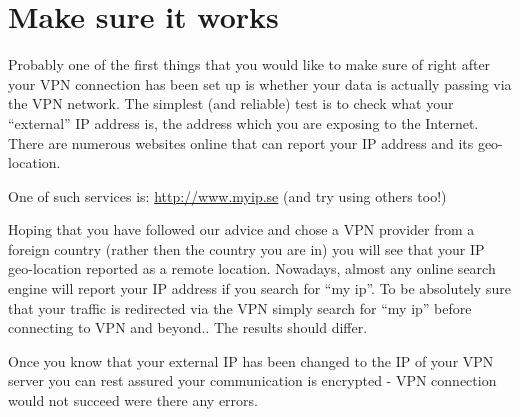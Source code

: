 \section{Make sure it works}

Probably one of the first things that you would like to make sure of
right after your VPN connection has been set up is whether your data is
actually passing via the VPN network. The simplest (and reliable) test
is to check what your ``external'' IP address is, the address which you
are exposing to the Internet. There are numerous websites online that
can report your IP address and its geo-location.

One of such services is: \href{http://www.myip.se}{http://www.myip.se}
(and try using others too!)

Hoping that you have followed our advice and chose a VPN provider from a
foreign country (rather then the country you are in) you will see that
your IP geo-location reported as a remote location. Nowadays, almost any
online search engine will report your IP address if you search for ``my
ip''. To be absolutely sure that your traffic is redirected via the VPN
simply search for ``my ip'' before connecting to VPN and beyond.. The
results should differ.

Once you know that your external IP has been changed to the IP of your
VPN server you can rest assured your communication is encrypted - VPN
connection would not succeed were there any errors.
